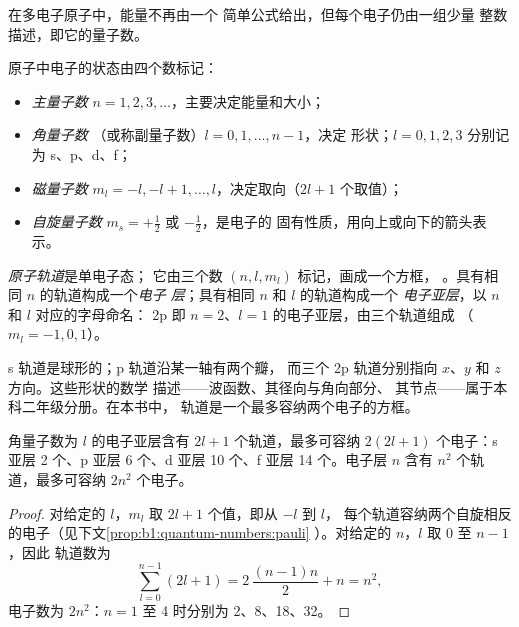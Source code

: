在多电子原子中，能量不再由一个
简单公式给出，但每个电子仍由一组少量
整数描述，即它的量子数。

\begin{definition}[量子数]\label{def:b1:quantum-numbers:quantum-number}
原子中电子的状态由四个数标记：
\begin{itemize}
  \item \emph{主量子数}
        $n = 1, 2, 3, \dots$，主要决定能量和大小；
  \item \emph{角量子数}
        （或称副量子数）$l = 0, 1, \dots, n-1$，决定
        形状；$l = 0, 1, 2, 3$ 分别记为 s、p、d、f；
  \item \emph{磁量子数}
        $m_l = -l, -l+1, \dots, l$，决定取向（$2l + 1$
        个取值）；
  \item \emph{自旋量子数}
        $m_s = +\tfrac12$ 或 $-\tfrac12$，是电子的
        固有性质，用向上或向下的箭头表示。
\end{itemize}
\end{definition}

\begin{definition}\label{def:b1:quantum-numbers:orbital}
\emph{原子轨道}是单电子态；
它由三个数 $(n, l, m_l)$ 标记，画成一个方框，
\omorbs{}。具有相同 $n$ 的轨道构成一个\emph{电子
层}；具有相同 $n$ 和 $l$ 的轨道构成一个
\emph{电子亚层}，以 $n$ 和 $l$ 对应的字母命名：
2p 即 $n = 2$、$l = 1$ 的电子亚层，由三个轨道组成
（$m_l = -1, 0, 1$）。
\end{definition}

\begin{remark}[形状]\label{rem:b1:quantum-numbers:shapes}
s 轨道是球形的；p 轨道沿某一轴有两个瓣，
而三个 2p 轨道分别指向 $x$、$y$ 和 $z$ 方向。这些形状的数学
描述——波函数、其径向与角向部分、
其节点——属于本科二年级分册。在本书中，
轨道是一个最多容纳两个电子的方框。
\end{remark}

\begin{proposition}[电子亚层与电子层的容量]\label{prop:b1:quantum-numbers:capacity}
角量子数为 $l$ 的电子亚层含有 $2l + 1$ 个轨道，最多可容纳
$2(2l + 1)$ 个电子：s 亚层 2 个、p 亚层 6 个、d 亚层 10 个、f 亚层 14 个。电子层 $n$
含有 $n^2$ 个轨道，最多可容纳 $2n^2$ 个电子。
\end{proposition}

\begin{proof}
对给定的 $l$，$m_l$ 取 $2l + 1$ 个值，即从 $-l$ 到 $l$，
每个轨道容纳两个自旋相反的电子（见下文\cref{prop:b1:quantum-numbers:pauli}
）。对给定的 $n$，$l$ 取 $0$ 至 $n - 1$，因此
轨道数为
\[
  \sum_{l=0}^{n-1} (2l+1) = 2\,\frac{(n-1)n}{2} + n = n^2 ,
\]
电子数为 $2n^2$：$n = 1$ 至 4 时分别为 2、8、18、32。
\end{proof}

